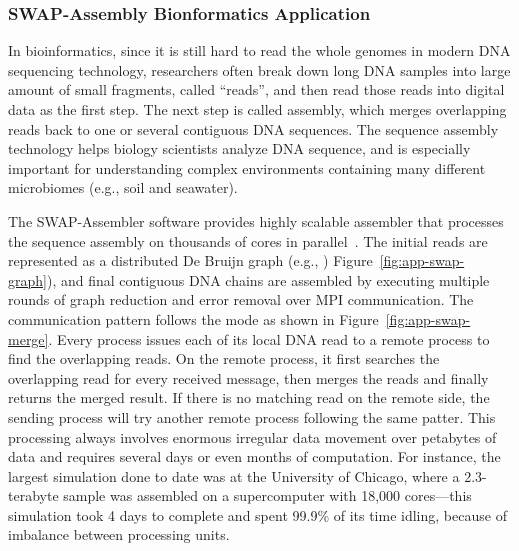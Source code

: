 \subsubsection{SWAP-Assembly Bionformatics Application}

In bioinformatics, since it is still hard to read the whole genomes
in modern DNA sequencing technology, researchers often break down long
DNA samples into large amount of small fragments, called ``reads'', and
then read those reads into digital data as the first step. The next step
is called assembly, which merges overlapping reads back to one or several
contiguous DNA sequences. The sequence assembly technology helps biology
scientists analyze DNA sequence, and is especially important for understanding
complex environments containing many different microbiomes (e.g., soil and
seawater).

The SWAP-Assembler software provides highly scalable assembler that processes
the sequence assembly on thousands of cores in parallel~\cite{swap}. The
initial reads are represented as a distributed De Bruijn graph (e.g., )
Figure~\ref{fig:app-swap-graph}), and final contiguous DNA chains are
assembled by executing multiple rounds of graph reduction and error removal
over MPI communication. The communication pattern follows the
 mode as shown in Figure~\ref{fig:app-swap-merge}.
Every process issues each of its local DNA read to a remote process to find
the overlapping reads. On the remote process, it first searches the
overlapping read for every received message, then merges the reads and
finally returns the merged result. If there is no matching read on the
remote side, the sending process will try another remote process following
the same patter. This processing always involves enormous irregular data
movement over petabytes of data and requires several days or even months of
computation. For instance, the largest simulation done to date was at the
University of Chicago, where a 2.3-terabyte sample was assembled on a
supercomputer with 18,000 cores—this simulation took 4 days to complete and
spent 99.9\% of its time idling, because of imbalance between processing
units.


